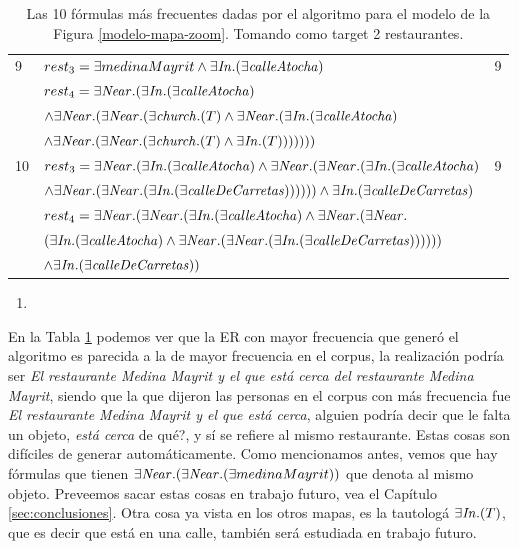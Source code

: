 \begin{table}[H]
\begin{center}
\begin{tabular}{|l|l|c|}
9&$rest_3 =\exists medinaMayrit \land \exists \mathit{In}.(\exists \mathit{calleAtocha})$ & 9\\
&$rest_4 = \exists \mathit{Near}.(\exists \mathit{In}.(\exists \mathit{calleAtocha}) $ & \\
&$ \land \exists \mathit{Near}.(\exists \mathit{Near}.(\exists \mathit{church}.(T)  \land \exists \mathit{Near}.(\exists \mathit{In}.(\exists \mathit{calleAtocha})  $ & \\
&$\land \exists \mathit{Near}.(\exists \mathit{Near}.(\exists \mathit{church}.(T)  \land \exists \mathit{In}.(T)))))))$&\\ \hline

10&$rest_3 = \exists \mathit{Near}.(\exists \mathit{In}.(\exists \mathit{calleAtocha})  \land \exists \mathit{Near}.(\exists \mathit{Near}.(\exists \mathit{In}.(\exists \mathit{calleAtocha}) $ & 9\\
&$ \land \exists \mathit{Near}.(\exists \mathit{Near}.(\exists \mathit{In}.(\exists \mathit{calleDeCarretas}))))))  \land \exists \mathit{In}.(\exists \mathit{calleDeCarretas})  $ & \\
&$rest_4 = \exists \mathit{Near}.(\exists \mathit{Near}.(\exists \mathit{In}.(\exists \mathit{calleAtocha})  \land \exists \mathit{Near}.(\exists \mathit{Near}.$ & \\
&$(\exists \mathit{In}.(\exists \mathit{calleAtocha})  \land \exists \mathit{Near}.(\exists \mathit{Near}.(\exists \mathit{In}.(\exists \mathit{calleDeCarretas})))))) $ & \\
&$ \land \exists \mathit{In}.(\exists \mathit{calleDeCarretas}))$&\\ \hline

\end{tabular}

\caption{Las 10 f\'ormulas m\'as frecuentes dadas por el algoritmo para el modelo de la Figura \protect\ref{modelo-mapa-zoom}. Tomando como target 2 restaurantes.}\label{formulas-mapa-zoom2}
\end{center}
\end{table}



\begin{enumerate}
\item 
\end{enumerate}    

En la Tabla \ref{formulas-mapa-zoom2} podemos ver que la ER con mayor frecuencia que gener\'o el algoritmo es parecida a la de mayor frecuencia en el corpus, la realizaci\'on podr\'ia ser {\it El restaurante Medina Mayrit y el que est\'a cerca del restaurante Medina Mayrit}, siendo que la que dijeron las personas en el corpus con m\'as frecuencia fue {\it El restaurante Medina Mayrit y el que est\'a cerca}, alguien podr\'ia decir que le falta un objeto, {\it est\'a cerca} de qu\'e?, y s\'i se refiere al mismo restaurante. Estas cosas son dif\'iciles de generar autom\'aticamente. Como mencionamos antes, vemos que hay f\'ormulas que tienen $\exists \mathit{Near}.(\exists \mathit{Near}.(\exists medinaMayrit))$ que denota al mismo objeto. Preveemos sacar estas cosas en trabajo futuro, vea el Cap\'itulo \ref{sec:conclusiones}. Otra cosa ya vista en los otros mapas, es la tautolog\'a $\exists \mathit{In}.(T)$, que es decir que est\'a en una calle, tambi\'en ser\'a estudiada en trabajo futuro.


